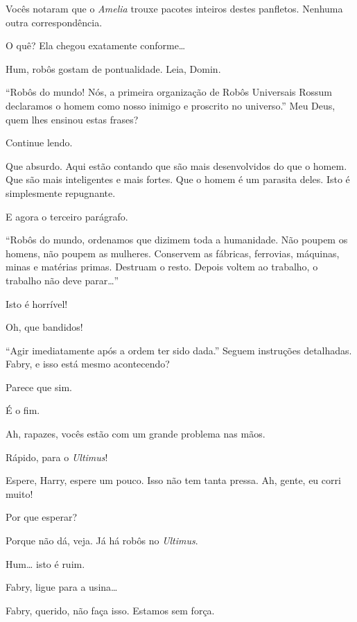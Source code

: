  Vocês notaram que o \textit{Amelia} trouxe pacotes inteiros destes panfletos.
Nenhuma outra correspondência.

  O quê? Ela chegou exatamente conforme\ldots{}

 Hum, robôs gostam de pontualidade. Leia, Domin.

  ``Robôs do mundo! Nós, a primeira organização de Robôs
Universais Rossum declaramos o homem como nosso inimigo e proscrito no
universo.'' Meu Deus, quem lhes ensinou estas frases?

 Continue lendo.

 Que absurdo. Aqui estão contando que são mais desenvolvidos do que o
homem. Que são mais inteligentes e mais fortes. Que o homem é um parasita deles.
Isto é simplesmente repugnante.

 E agora o terceiro parágrafo. 

  ``Robôs do mundo, ordenamos que dizimem toda a humanidade. 
Não poupem os homens, não poupem as mulheres. Conservem as fábricas,
ferrovias, máquinas, minas e matérias primas. Destruam o resto. Depois voltem ao
trabalho, o trabalho não deve parar\ldots{}''

 Isto é horrível!

 Oh, que bandidos!

  ``Agir imediatamente após a ordem ter sido dada.'' Seguem
instruções detalhadas. Fabry, e isso está mesmo acontecendo?

 Parece que sim.

 É o fim.

 Ah, rapazes, vocês estão com um grande problema nas mãos.

 Rápido, para o \textit{Ultimus}!

 Espere, Harry, espere um pouco. Isso não tem tanta pressa.  Ah, gente, eu corri muito!

 Por que esperar?

 Porque não dá, veja. Já há robôs no \textit{Ultimus}.

 Hum\ldots{} isto é ruim.

 Fabry, ligue para a usina\ldots{}

 Fabry, querido, não faça isso. Estamos sem força.

